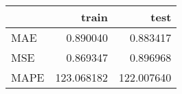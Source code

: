 \begin{tabular}{lrr}
\toprule
{} &       train &        test \\
\midrule
MAE  &    0.890040 &    0.883417 \\
MSE  &    0.869347 &    0.896968 \\
MAPE &  123.068182 &  122.007640 \\
\bottomrule
\end{tabular}
